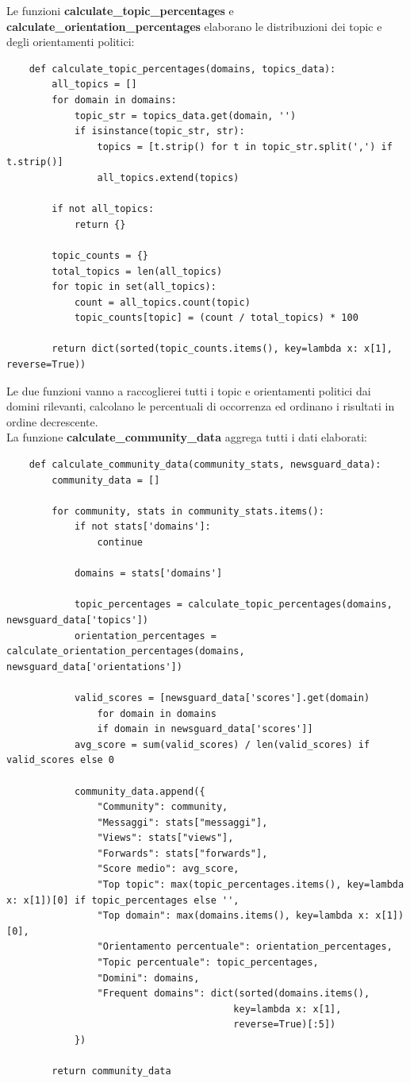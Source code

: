 \documentclass[12pt]{article}
\begin{document}
	Le funzioni \textbf{calculate\_topic\_percentages} e \textbf{calculate\_orientation\_percentages} elaborano le distribuzioni dei topic e degli orientamenti politici:
	\begin{lstlisting}
	def calculate_topic_percentages(domains, topics_data):
		all_topics = []
		for domain in domains:
			topic_str = topics_data.get(domain, '')
			if isinstance(topic_str, str):
				topics = [t.strip() for t in topic_str.split(',') if t.strip()]
				all_topics.extend(topics)
		
		if not all_topics:
			return {}
		
		topic_counts = {}
		total_topics = len(all_topics)
		for topic in set(all_topics):
			count = all_topics.count(topic)
			topic_counts[topic] = (count / total_topics) * 100
		
		return dict(sorted(topic_counts.items(), key=lambda x: x[1], reverse=True))
	\end{lstlisting}
	Le due funzioni vanno a raccoglierei tutti i topic e orientamenti politici dai domini rilevanti, calcolano le percentuali di occorrenza ed ordinano i risultati in ordine decrescente.\\
	La funzione \textbf{calculate\_community\_data} aggrega tutti i dati elaborati:
	\begin{lstlisting}
	def calculate_community_data(community_stats, newsguard_data):
		community_data = []
		
		for community, stats in community_stats.items():
			if not stats['domains']:
				continue
		
			domains = stats['domains']
		
			topic_percentages = calculate_topic_percentages(domains, newsguard_data['topics'])
			orientation_percentages = calculate_orientation_percentages(domains, newsguard_data['orientations'])
		
			valid_scores = [newsguard_data['scores'].get(domain) 
				for domain in domains 
				if domain in newsguard_data['scores']]
			avg_score = sum(valid_scores) / len(valid_scores) if valid_scores else 0
		
			community_data.append({
				"Community": community,
				"Messaggi": stats["messaggi"],
				"Views": stats["views"],
				"Forwards": stats["forwards"],
				"Score medio": avg_score,
				"Top topic": max(topic_percentages.items(), key=lambda x: x[1])[0] if topic_percentages else '',
				"Top domain": max(domains.items(), key=lambda x: x[1])[0],
				"Orientamento percentuale": orientation_percentages,
				"Topic percentuale": topic_percentages,
				"Domini": domains,
				"Frequent domains": dict(sorted(domains.items(),
										key=lambda x: x[1], 
										reverse=True)[:5])
			})
		
		return community_data
	\end{lstlisting}
\end{document}
